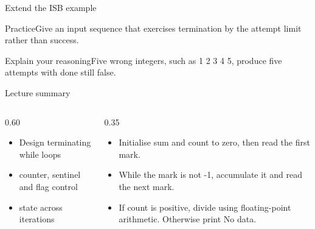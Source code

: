 \documentclass[10pt,aspectratio=169]{beamer}
\begin{document}
\begin{frame}[fragile,t]{Extend the ISB example}
\begin{alertblock}{Practice}Give an input sequence that exercises termination by the attempt limit rather than success.\end{alertblock}\vspace{3mm}\begin{exampleblock}{Explain your reasoning}Five wrong integers, such as 1 2 3 4 5, produce five attempts with done still false.\end{exampleblock}
\end{frame}
\begin{frame}[fragile,t]{Lecture summary}
\begin{columns}[T,onlytextwidth]\begin{column}{0.60\textwidth}
\begin{itemize}
\item Design terminating while loops
\item counter, sentinel and flag control
\item state across iterations
\end{itemize}
\end{column}\begin{column}{0.35\textwidth}\small
\begin{itemize}
\item Initialise sum and count to zero, then read the first mark.
\item While the mark is not -1, accumulate it and read the next mark.
\item If count is positive, divide using floating-point arithmetic. Otherwise print No data.
\end{itemize}
\end{column}\end{columns}
\end{frame}
\end{document}
